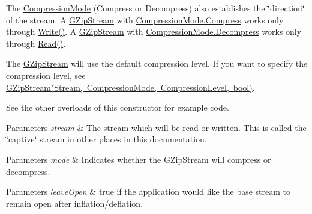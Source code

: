 The \mbox{\hyperlink{namespace_super_tiled2_unity_1_1_ionic_1_1_zlib_ad5b7635d92497e1c905e5de82eb1c6b1}{Compression\+Mode}} (Compress or Decompress) also establishes the \char`\"{}direction\char`\"{} of the stream. A {\ttfamily \mbox{\hyperlink{class_super_tiled2_unity_1_1_ionic_1_1_zlib_1_1_g_zip_stream}{G\+Zip\+Stream}}} with {\ttfamily \mbox{\hyperlink{namespace_super_tiled2_unity_1_1_ionic_1_1_zlib_ad5b7635d92497e1c905e5de82eb1c6b1a8fa4fcfcda70410e089984d5f51ae97d}{Compression\+Mode.\+Compress}}} works only through {\ttfamily \mbox{\hyperlink{class_super_tiled2_unity_1_1_ionic_1_1_zlib_1_1_g_zip_stream_a49032afb5806563236a5d53841abe2b8}{Write()}}}. A {\ttfamily \mbox{\hyperlink{class_super_tiled2_unity_1_1_ionic_1_1_zlib_1_1_g_zip_stream}{G\+Zip\+Stream}}} with {\ttfamily \mbox{\hyperlink{namespace_super_tiled2_unity_1_1_ionic_1_1_zlib_ad5b7635d92497e1c905e5de82eb1c6b1a6d2861192fdf4370bcf95c099be0f2f0}{Compression\+Mode.\+Decompress}}} works only through {\ttfamily \mbox{\hyperlink{class_super_tiled2_unity_1_1_ionic_1_1_zlib_1_1_g_zip_stream_a772b5013a585850ffaf8be4aa7f3dbcf}{Read()}}}. 

The {\ttfamily \mbox{\hyperlink{class_super_tiled2_unity_1_1_ionic_1_1_zlib_1_1_g_zip_stream}{G\+Zip\+Stream}}} will use the default compression level. If you want to specify the compression level, see \mbox{\hyperlink{class_super_tiled2_unity_1_1_ionic_1_1_zlib_1_1_g_zip_stream_a3cb29104487c56e6f58a24ce79ee546d}{G\+Zip\+Stream(\+Stream,
  Compression\+Mode, Compression\+Level, bool)}}. 

See the other overloads of this constructor for example code. 


\begin{DoxyParams}{Parameters}
{\em stream} & The stream which will be read or written. This is called the \char`\"{}captive\char`\"{} stream in other places in this documentation. \\
\hline
\end{DoxyParams}



\begin{DoxyParams}{Parameters}
{\em mode} & Indicates whether the \mbox{\hyperlink{class_super_tiled2_unity_1_1_ionic_1_1_zlib_1_1_g_zip_stream}{G\+Zip\+Stream}} will compress or decompress. \\
\hline
\end{DoxyParams}



\begin{DoxyParams}{Parameters}
{\em leave\+Open} & true if the application would like the base stream to remain open after inflation/deflation. \\
\hline
\end{DoxyParams}
\mbox{\label{class_super_tiled2_unity_1_1_ionic_1_1_zlib_1_1_g_zip_stream_a3cb29104487c56e6f58a24ce79ee546d}} 
